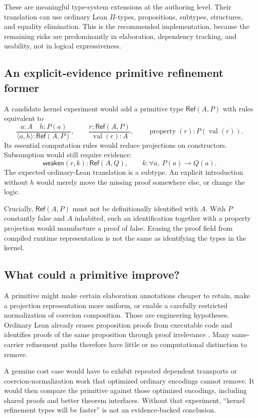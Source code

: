 \documentclass[11pt,a4paper]{article}
\newcommand{\AlderRef}{\mathsf{Ref}}\newcommand{\Spec}{\mathsf{Spec}}
\theoremstyle{plain}
\theoremstyle{definition}
\theoremstyle{remark}
\begin{document}
These are meaningful type-system extensions at the authoring level. Their translation can use ordinary Lean $\Pi$-types, propositions, subtypes, structures, and equality elimination. This is the recommended implementation, because the remaining risks are predominantly in elaboration, dependency tracking, and usability, not in logical expressiveness.

\subsection{An explicit-evidence primitive refinement former}
A candidate kernel experiment would add a primitive type $\AlderRef(A,P)$ with rules equivalent to
\[
 \frac{a:A\quad h:P(a)}{\langle a,h\rangle:\AlderRef(A,P)},
 \qquad \frac{r:\AlderRef(A,P)}{\operatorname{val}(r):A},
 \qquad \operatorname{property}(r):P(\operatorname{val}(r)).
\]
Its essential computation rules would reduce projections on constructors. Subsumption would still require evidence:
\[
 \mathsf{weaken}(r,k):\AlderRef(A,Q),\qquad
 k:\forall a,\ P(a)\to Q(a).
\]
The expected ordinary-Lean translation is a subtype. An explicit introduction without $h$ would merely move the missing proof somewhere else, or change the logic.

Crucially, $\AlderRef(A,P)$ must not be definitionally identified with $A$. With $P$ constantly false and $A$ inhabited, such an identification together with a property projection would manufacture a proof of false. Erasing the proof field from compiled runtime representation is not the same as identifying the types in the kernel.

\subsection{What could a primitive improve?}
A primitive might make certain elaboration annotations cheaper to retain, make a projection representation more uniform, or enable a carefully restricted normalization of coercion composition. Those are engineering hypotheses. Ordinary Lean already erases proposition proofs from executable code and identifies proofs of the same proposition through proof irrelevance \cite{leanref}. Many same-carrier refinement paths therefore have little or no computational distinction to remove.

A genuine cost case would have to exhibit repeated dependent transports or coercion-normalization work that optimized ordinary encodings cannot remove. It would then compare the primitive against those optimized encodings, including shared proofs and better theorem interfaces. Without that experiment, ``kernel refinement types will be faster'' is not an evidence-backed conclusion.
\end{document}
